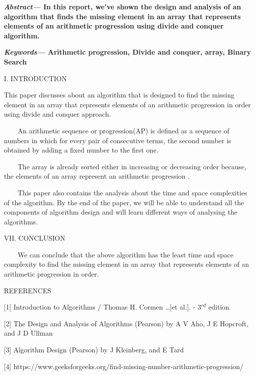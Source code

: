 \documentclass[12pt,a4paper]{article}
\begin{document}
\begin{multicols}{2}
\textbf{\textit{Abstract--- }In this report, we've shown the design and analysis of an algorithm that finds the missing element in an array that represents elements of an arithmetic progression using divide and conquer algorithm.}

\textbf{\textit{Keywords--- } Arithmetic progression, Divide and conquer, array, Binary Search }

\begin{center}I. INTRODUCTION\end{center}

This paper discusses about an algorithm that is  designed to  find the missing element in an array that represents elements of an arithmetic progression in order using divide and conquer approach.

\ \ \ \  An arithmetic sequence or progression(AP) is defined as a sequence of numbers in which for every pair of consecutive terms, the second number is obtained by adding a fixed number to the first one.

\ \ \ \ The array is already sorted either in increasing or decreasing order because, the elements of an array represent an arithmetic progression . 
 
\ \ \ \ This paper also contains the analysis about the time and space complexities of the algorithm. By the end of the paper, we will be able to understand all the components of algorithm design and will learn different ways of analysing the 
algorithms. 





\begin{center}VII. CONCLUSION\end{center}

\ \ \ \ We can conclude that the above algorithm has the least time and space 
complexity to find the missing element in an array that represents elements of an arithmetic progression in order.


\begin{center}REFERENCES\end{center}

$[$1$]$ Introduction to Algorithms / Thomas H. Cormen \ldots $[$et 
al.$]$. - 3$^{rd}$ edition.

$[$2$]$ The Design and Analysis of Algorithms (Pearson) by A V Aho, J E 
Hopcroft, and J D Ullman 

$[$3$]$ Algorithm Design (Pearson) by J Kleinberg, and E Tard

$[$4$]$ https://www.geeksforgeeks.org/find-missing-number-arithmetic-progression/

\end{multicols}
\end{document}
